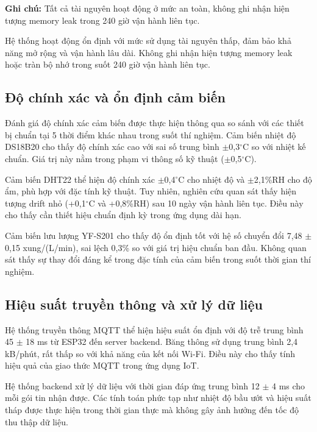 \documentclass[../main.tex]{subfiles}
\begin{document}
\textbf{Ghi chú:} Tất cả tài nguyên hoạt động ở mức an toàn, không ghi nhận hiện tượng memory leak trong 240 giờ vận hành liên tục.

Hệ thống hoạt động ổn định với mức sử dụng tài nguyên thấp, đảm bảo khả năng mở rộng và vận hành lâu dài. Không ghi nhận hiện tượng memory leak hoặc tràn bộ nhớ trong suốt 240 giờ vận hành liên tục.

\subsection{Độ chính xác và ổn định cảm biến}
\label{sec:sensor_accuracy_stability}

Đánh giá độ chính xác cảm biến được thực hiện thông qua so sánh với các thiết bị chuẩn tại 5 thời điểm khác nhau trong suốt thí nghiệm. Cảm biến nhiệt độ DS18B20 cho thấy độ chính xác cao với sai số trung bình $\pm$0,3${^\circ\mathrm{C}}$ so với nhiệt kế chuẩn. Giá trị này nằm trong phạm vi thông số kỹ thuật ($\pm$0,5${^\circ\mathrm{C}}$).

Cảm biến DHT22 thể hiện độ chính xác $\pm$0,4${^\circ\mathrm{C}}$ cho nhiệt độ và $\pm$2,1\%RH cho độ ẩm, phù hợp với đặc tính kỹ thuật. Tuy nhiên, nghiên cứu quan sát thấy hiện tượng drift nhỏ (+0,1${^\circ\mathrm{C}}$ và +0,8\%RH) sau 10 ngày vận hành liên tục. Điều này cho thấy cần thiết hiệu chuẩn định kỳ trong ứng dụng dài hạn.

Cảm biến lưu lượng YF-S201 cho thấy độ ổn định tốt với hệ số chuyển đổi 7,48 $\pm$ 0,15 xung/(L/min), sai lệch 0,3\% so với giá trị hiệu chuẩn ban đầu. Không quan sát thấy sự thay đổi đáng kể trong đặc tính của cảm biến trong suốt thời gian thí nghiệm.

\subsection{Hiệu suất truyền thông và xử lý dữ liệu}
\label{sec:communication_data_processing}

Hệ thống truyền thông MQTT thể hiện hiệu suất ổn định với độ trễ trung bình 45 $\pm$ 18 ms từ ESP32 đến server backend. Băng thông sử dụng trung bình 2,4 kB/phút, rất thấp so với khả năng của kết nối Wi-Fi. Điều này cho thấy tính hiệu quả của giao thức MQTT trong ứng dụng IoT.

Hệ thống backend xử lý dữ liệu với thời gian đáp ứng trung bình 12 $\pm$ 4 ms cho mỗi gói tin nhận được. Các tính toán phức tạp như nhiệt độ bầu ướt và hiệu suất tháp được thực hiện trong thời gian thực mà không gây ảnh hưởng đến tốc độ thu thập dữ liệu.
\end{document}
